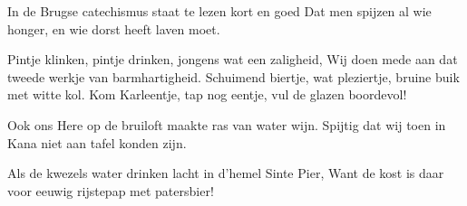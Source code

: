 \beginverse
In de Brugse catechismus
staat te lezen kort en goed
Dat men spijzen al wie honger,
en wie dorst heeft laven moet.
\endverse

\beginchorus
Pintje klinken,
pintje drinken,
jongens wat een zaligheid,
Wij doen mede
aan dat tweede
werkje van barmhartigheid.
Schuimend biertje,
wat pleziertje,
bruine buik met witte kol.
Kom Karleentje,
tap nog eentje,
vul de glazen boordevol!
\endchorus

\beginverse
Ook ons Here op de bruiloft
maakte ras van water wijn.
Spijtig dat wij toen in Kana
niet aan tafel konden zijn.
\endverse

\beginverse
Als de kwezels water drinken
lacht in d'hemel Sinte Pier,
Want de kost is daar voor eeuwig
rijstepap met patersbier!
\endverse
\endsong